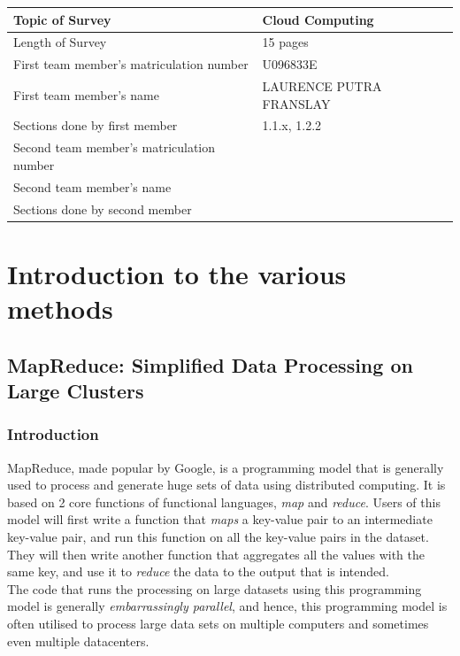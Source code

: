 \documentclass[]{article}
\begin{document}
\begin{table}[here]
\centering
\begin{tabularx}{\textwidth}{| X | X | }
\hline
Topic of Survey								& 	Cloud Computing\\
\hline
Length of Survey							& 	15 pages\\
\hline
First team member's matriculation number	&	U096833E\\
\hline
First team member's name					&	LAURENCE PUTRA FRANSLAY\\
\hline
Sections done by first member				& 	1.1.x, 1.2.2\\
\hline
Second team member's matriculation number	&	\\
\hline
Second team member's name					&	\\
\hline
Sections done by second member				& 	\\
\hline

\hline
\end{tabularx}
\end{table}

\pagebreak

\section{Introduction to the various methods}
\subsection{MapReduce: Simplified Data Processing on Large Clusters}
\subsubsection{Introduction}
MapReduce, made popular by Google, is a programming model that is generally used to process and generate huge sets of data using distributed computing. It is based on 2 core functions of functional languages, \emph{map} and \emph{reduce}. Users of this model will first write a function that \emph{maps} a key-value pair to an intermediate key-value pair, and run this function on all the key-value pairs in the dataset. They will then write another function that aggregates all the values with the same key, and use it to \emph{reduce} the data to the output that is intended. \\

The code that runs the processing on large datasets using this programming model is generally \emph{embarrassingly parallel}\footnotemark{}, and hence, this programming model is often utilised to process large data sets on multiple computers and sometimes even multiple datacenters. \\
\end{document}
